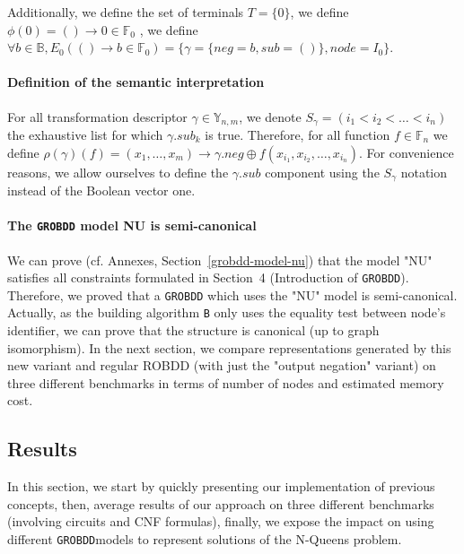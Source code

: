 \documentclass[a4paper,10pt]{article}
\newcommand{\B}{\mathbb{B}}
\newcommand{\F}{\mathbb{F}}
\newcommand{\Y}{\mathbb{Y}}
\newcommand{\GroBdd}{\texttt{GROBDD}}
\begin{document}
Additionally, we define the set of terminals $T=\{0\}$, we define $\phi(0)=()\longrightarrow{}0\in\F_0$ , we define $\forall b\in\B, E_0(()\longrightarrow b\in\F_0) = \{\gamma = \{neg = b, sub = ()\}, node = I_0\}$.

\paragraph{Definition of the semantic interpretation}

For all transformation descriptor $\gamma\in\Y_{n, m}$, we denote $S_\gamma = \left(i_1 < i_2 < \dots < i_n\right)$ the exhaustive list for which $\gamma.sub_k$ is true.
Therefore, for all function $f\in\F_n$ we define $\rho(\gamma)(f) = (x_1, \dots, x_m) \longrightarrow \gamma.neg \oplus f(x_{i_1}, x_{i_2}, \dots, x_{i_n})$.
For convenience reasons, we allow ourselves to define the $\gamma.sub$ component using the $S_\gamma$ notation instead of the Boolean vector one.


  
\paragraph{The \GroBdd{} model NU is semi-canonical}
We can prove (cf. Annexes, Section~\ref{grobdd-model-nu}) that the model "NU" satisfies all constraints formulated in Section~4 (Introduction of \GroBdd{}).
Therefore, we proved that a \GroBdd{} which uses the "NU" model is semi-canonical.
Actually, as the building algorithm \texttt{B} only uses the equality test between node's identifier, we can prove that the structure is canonical (up to graph isomorphism).
In the next section, we compare representations generated by this new variant and regular ROBDD (with just the "output negation" variant) on three different benchmarks in terms of number of nodes and estimated memory cost.

\subsection{Results}
In this section, we start by quickly presenting our implementation of previous concepts, then, average results of our approach on three different benchmarks (involving circuits and CNF formulas), finally, we expose the impact on using different \GroBdd models to represent solutions of the N-Queens problem.
\end{document}
